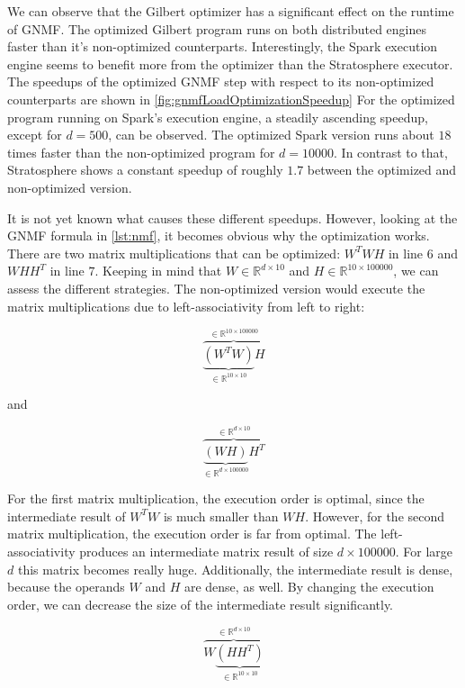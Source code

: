 We can observe that the Gilbert optimizer has a significant effect on the runtime of GNMF.
The optimized Gilbert program runs on both distributed engines faster than it's non-optimized counterparts.
Interestingly, the Spark execution engine seems to benefit more from the optimizer than the Stratosphere executor.
The speedups of the optimized GNMF step with respect to its non-optimized counterparts are shown in \cref{fig:gnmfLoadOptimizationSpeedup}
For the optimized program running on Spark's execution engine, a steadily ascending speedup, except for $d=500$, can be observed.
The optimized Spark version runs about $18$ times faster than the non-optimized program for $d=10000$.
In contrast to that, Stratosphere shows a constant speedup of roughly $1.7$ between the optimized and non-optimized version.

It is not yet known what causes these different speedups.
However, looking at the GNMF formula in \cref{lst:nmf}, it becomes obvious why the optimization works.
There are two matrix multiplications that can be optimized: $W^T WH$ in line $6$ and $WHH^T$ in line $7$.
Keeping in mind that $W\in \mathbb{R}^{d\times 10}$ and $H\in \mathbb{R}^{10 \times 100000}$, we can assess the different strategies.
The non-optimized version would execute the matrix multiplications due to left-associativity from left to right:

\begin{displaymath}
	\overbrace{\underbrace{\left(W^T W\right)}_{\in \mathbb{R}^{10\times 10}}H}^{\in\mathbb{R}^{10\times 100000}}
\end{displaymath}

and

\begin{displaymath}
	\overbrace{\underbrace{\left(WH\right)}_{\in \mathbb{R}^{d \times 100000}}H^T}^{\in \mathbb{R}^{d\times 10}}
\end{displaymath}

For the first matrix multiplication, the execution order is optimal, since the intermediate result of $W^T W$ is much smaller than $WH$.
However, for the second matrix multiplication, the execution order is far from optimal.
The left-associativity produces an intermediate matrix result of size $d\times 100000$.
For large $d$ this matrix becomes really huge.
Additionally, the intermediate result is dense, because the operands $W$ and $H$ are dense, as well.
By changing the execution order, we can decrease the size of the intermediate result significantly.

\begin{displaymath}
	\overbrace{W\underbrace{\left(HH^T\right)}_{\in \mathbb{R}^{10 \times 10}}}^{\in \mathbb{R}^{d\times 10}}
\end{displaymath}

